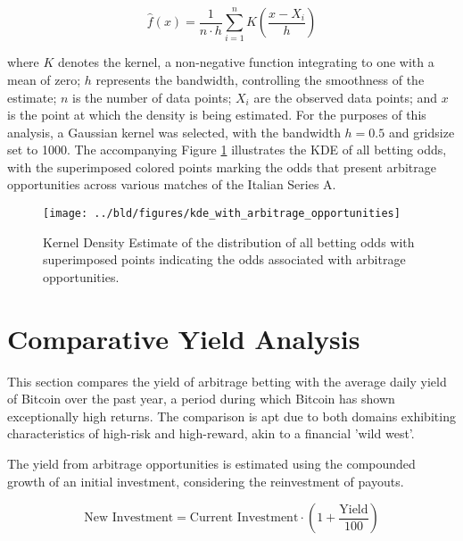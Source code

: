 \documentclass[11pt, a4paper, leqno]{article}
\begin{document}
\begin{equation}
\hat{f}(x) = \frac{1}{n\cdot h} \sum_{i=1}^{n} K\left(\frac{x - X_i}{h}\right)
\end{equation}

where \(K\) denotes the kernel, a non-negative function integrating to one with a mean of zero; \(h\) represents the bandwidth, controlling the smoothness of the estimate; \(n\) is the number of data points; \(X_i\) are the observed data points; and \(x\) is the point at which the density is being estimated. For the purposes of this analysis, a Gaussian kernel was selected, with the bandwidth \(h = 0.5\) and gridsize set to 1000.
The accompanying Figure \ref{fig:kde_arbitrage_opportunities} illustrates the KDE of all betting odds, with the superimposed colored points marking the odds that present arbitrage opportunities across various matches of the Italian Series A.

\begin{figure}[H]

    \centering
    \texttt{[image: ../bld/figures/kde\_with\_arbitrage\_opportunities]}

    \caption{ Kernel Density Estimate of the distribution of all betting odds with superimposed points indicating the odds associated with arbitrage opportunities.}
    \label{fig:kde_arbitrage_opportunities}

\end{figure}

\section{Comparative Yield Analysis}
\label{sec:comparative_yield_analysis}

This section compares the yield of arbitrage betting with the average daily yield of Bitcoin over the past year, a period during which Bitcoin has shown exceptionally high returns. The comparison is apt due to both domains exhibiting characteristics of high-risk and high-reward, akin to a financial 'wild west'.

The yield from arbitrage opportunities is estimated using the compounded growth of an initial investment, considering the reinvestment of payouts.

\begin{equation}
    \text{New Investment} = \text{Current Investment} \cdot \left(1 + \frac{\text{Yield}}{100}\right)
\end{equation}
\end{document}
